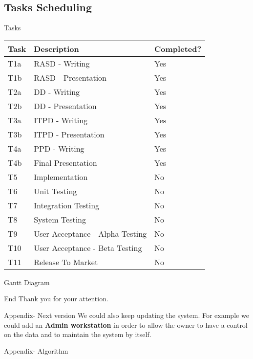 \documentclass{../Common/Structure/pdf_presentation}
\begin{document}
	\subsection{Tasks Scheduling}
	\begin{frame}{Tasks}
		\begin{tabulary}{\linewidth\tymin=70pt}{Y{2cm}|Y{4cm}|Y{2.25cm}}
			\textbf{Task} & \textbf{Description} & \textbf{Completed?}\\ \hline
			T1a & RASD - Writing & Yes \\ \hline
			T1b & RASD - Presentation & Yes \\ \hline
			T2a & DD - Writing & Yes \\ \hline
			T2b & DD - Presentation & Yes \\ \hline
			T3a & ITPD - Writing & Yes \\ \hline
			T3b & ITPD - Presentation & Yes \\ \hline
			T4a & PPD - Writing & Yes \\ \hline
			T4b & Final Presentation & Yes \\ \hline
			T5 & Implementation & No \\ \hline
			T6 & Unit Testing & No \\ \hline
			T7 & Integration Testing & No \\ \hline
			T8 & System Testing & No \\ \hline
			T9 & User Acceptance - Alpha Testing & No \\ \hline
			T10 & User Acceptance - Beta Testing & No \\ \hline
			T11 & Release To Market & No \\
		\end{tabulary}
	\end{frame}
	\begin{frame}{Gantt Diagram}
	\end{frame}
	\begin{frame}{End}
		Thank you for your attention.
	\end{frame}
	\begin{frame}{Appendix- Next version}
		We could also keep updating the system.
		For example we could add an \textbf{Admin workstation} in order to allow the owner to have a control on the data and
		to maintain the system by itself.
	\end{frame}
	\begin{frame}{Appendix- Algorithm}
	\end{frame}
\end{document}
